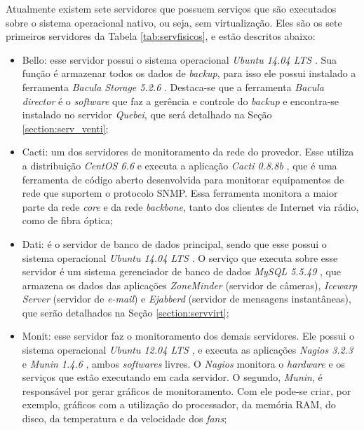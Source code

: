 Atualmente existem sete servidores que possuem serviços que são executados sobre o sistema operacional nativo, ou seja, sem virtualização. 
Eles são os sete primeiros servidores da Tabela \ref{tab:servfisicos}, e estão descritos abaixo:
\begin{itemize}
 \item Bello: esse servidor possui o sistema operacional \textit{Ubuntu 14.04 \ac{LTS}} \cite{ubuntu}. Sua função é armazenar todos os 
 dados de \textit{backup}, para isso ele possui instalado a ferramenta \textit{Bacula Storage 5.2.6} \cite{bacula}. Destaca-se que a ferramenta 
 \textit{Bacula director} é o \textit{software} que faz a gerência e controle do \textit{backup} e encontra-se instalado no servidor 
 \textit{Quebei}, que será detalhado na Seção \ref{section:serv_venti};
 
 \item Cacti: um dos servidores de monitoramento da rede do provedor. Esse utiliza a distribuição \textit{CentOS 6.6} \cite{centos} e executa a 
 aplicação \textit{Cacti 0.8.8b} \cite{cacti}, que é uma ferramenta de código aberto desenvolvida para monitorar equipamentos de rede que 
 suportem o protocolo \ac{SNMP}. Essa ferramenta monitora a maior parte da rede \textit{core} e da rede \textit{backbone}, tanto dos clientes de 
 Internet via rádio, como de fibra óptica;
 
 \item Dati: é o servidor de banco de dados principal, sendo que esse possui o sistema operacional \textit{Ubuntu 14.04 \ac{LTS}} \cite{ubuntu}. 
 O serviço que executa sobre esse servidor é um sistema gerenciador de banco de dados \textit{MySQL 5.5.49} \cite{mysql}, que armazena os dados 
 das aplicações \textit{ZoneMinder} \cite{zoneminder} (servidor de câmeras), \textit{Icewarp Server} \cite{icewarp} (servidor de \textit{e-mail})
 e \textit{Ejabberd} \cite{ejabberd} (servidor de mensagens instantâneas), que serão detalhados na Seção \ref{section:servvirt};
 
 \item Monit: esse servidor faz o monitoramento dos demais servidores. Ele possui o sistema operacional \textit{Ubuntu 12.04 \ac{LTS}} 
 \cite{ubuntu}, e executa as aplicações \textit{Nagios 3.2.3} \cite{nagios} e \textit{Munin 1.4.6} \cite{munin}, ambos \textit{softwares} livres. 
 O \textit{Nagios} monitora o \textit{hardware} e os serviços que estão executando em cada servidor. O segundo, \textit{Munin}, é responsável por 
 gerar gráficos de monitoramento. Com ele pode-se criar, por exemplo, gráficos com a utilização do processador, da memória RAM, do disco, da 
 temperatura e da velocidade dos \textit{fans};
 

\end{itemize}

